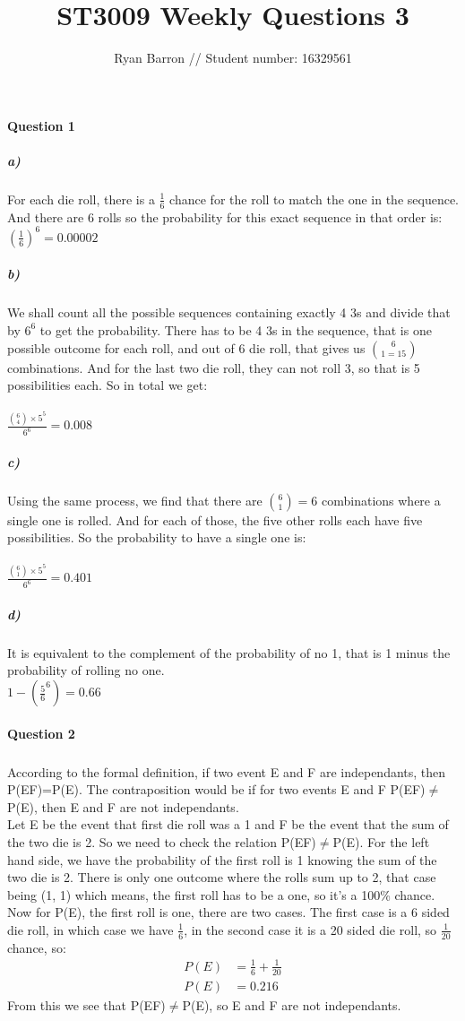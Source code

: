 \documentclass{article}
\title{ST3009 Weekly Questions 3}
\author{Ryan Barron // Student number: 16329561}
\date{}
\begin{document}
\maketitle

\paragraph{Question 1}
\subparagraph{a)}   
For each die roll, there is a $\frac{1}{6}$ chance for the roll to match the one in the sequence. And there are 6 rolls so the probability for this exact sequence in that order is: $(\frac{1}{6})^6 = 0.00002$
\subparagraph{b)}
We shall count all the possible sequences containing exactly 4 3s and divide that by $6^6$ to get the probability.
There has to be 4 3s in the sequence, that is one possible outcome for each roll, and out of 6 die roll, that gives us $6 \choose{1} = 15$ combinations. And for the last two die roll, they can not roll 3, so that is 5 possibilities each. So in total we get: \\ \\ $\frac{{6\choose4}\times5^5}{6^6} = 0.008$  	
\subparagraph{c)}
Using the same process, we find that there are ${6\choose1} = 6$ combinations where a single one is rolled. And for each of those, the five other rolls each have five possibilities. So the probability to have a single one is: \\ \\ 
$\frac{{6\choose1}\times5^5}{6^6} = 0.401$
\subparagraph{d)}
It is equivalent to the complement of the probability of no 1, that is 1 minus the probability of rolling no one.\\
$1-(\frac{5}{6}^6) = 0.66$	
\pagebreak
\paragraph{Question 2}
\subparagraph{}
According to the formal definition, if two event E and F are independants, then P(E\textbar F)=P(E). The contraposition would be 
if for two events E and F P(E\textbar F)$\neq$P(E), then E and F are not independants. \\
Let E be the event that first die roll was a 1 and F be the event that the sum of the two die is 2. So we need to check the relation P(E\textbar F)$\neq$P(E). For the left hand side, we have the probability of the first roll is 1 knowing the sum of the two die is 2. There is only one outcome where the rolls sum up to 2, that case being (1, 1) which means, the first roll has to be a one, so it's a 100\% chance. Now for P(E), the first roll is one, there are two cases. The first case is a 6 sided die roll, in which case we have $\frac{1}{6}$, in the second case it is a 20 sided die roll, so $\frac{1}{20}$ chance, so:
\begin{equation*}
\begin{split}
P(E) & = \frac{1}{6}+\frac{1}{20} \\ P(E) & = 0.216
\end{split}
\end{equation*}
From this we see that P(E\textbar F)$\neq$P(E), so E and F are not independants.
\end{document}
